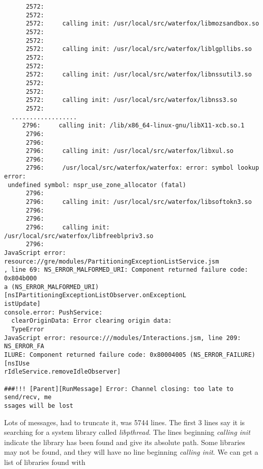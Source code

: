 \documentclass[a4paper]{article}  %
\begin{document}
\begin{tcolorbox}[breakable]
\begin{verbatim}
      2572:
      2572:
      2572:     calling init: /usr/local/src/waterfox/libmozsandbox.so
      2572:
      2572:
      2572:     calling init: /usr/local/src/waterfox/liblgpllibs.so
      2572:
      2572:
      2572:     calling init: /usr/local/src/waterfox/libnssutil3.so
      2572:
      2572:
      2572:     calling init: /usr/local/src/waterfox/libnss3.so
      2572:
  ..................
     2796:     calling init: /lib/x86_64-linux-gnu/libX11-xcb.so.1
      2796:
      2796:
      2796:     calling init: /usr/local/src/waterfox/libxul.so
      2796:
      2796:     /usr/local/src/waterfox/waterfox: error: symbol lookup error:
 undefined symbol: nspr_use_zone_allocator (fatal)
      2796:
      2796:     calling init: /usr/local/src/waterfox/libsoftokn3.so
      2796:
      2796:
      2796:     calling init: /usr/local/src/waterfox/libfreeblpriv3.so
      2796:
JavaScript error: resource://gre/modules/PartitioningExceptionListService.jsm
, line 69: NS_ERROR_MALFORMED_URI: Component returned failure code: 0x804b000
a (NS_ERROR_MALFORMED_URI) [nsIPartitioningExceptionListObserver.onExceptionL
istUpdate]
console.error: PushService:
  clearOriginData: Error clearing origin data:
  TypeError
JavaScript error: resource:///modules/Interactions.jsm, line 209: NS_ERROR_FA
ILURE: Component returned failure code: 0x80004005 (NS_ERROR_FAILURE) [nsIUse
rIdleService.removeIdleObserver]

###!!! [Parent][RunMessage] Error: Channel closing: too late to send/recv, me
ssages will be lost
\end{verbatim}
\end{tcolorbox}
Lots of messages, had to truncate it, was 5744 lines.
The first 3 lines say it is searching for a system library called {\em libpthread}. The lines beginning {\em calling init} indicate the library has been found and give its absolute path. Some libraries may not be found, and they will have no line beginning {\em calling init}. We can get a list of libraries found with 
\end{document}
